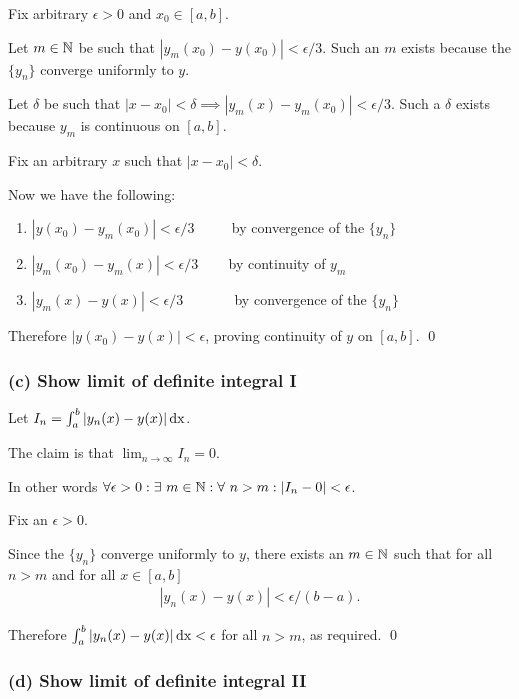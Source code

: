 \documentclass[12pt]{article}
\begin{document}

Fix arbitrary $\epsilon > 0$ and $x_0 \in [a,b]$.

Let $m \in \mathbb{N}$ be such that $|y_m(x_0) - y(x_0)| < \epsilon/3$. Such an $m$
exists because the $\{y_n\}$ converge uniformly to $y$.

Let $\delta$ be such that
$|x - x_0| < \delta \implies |y_m(x) - y_m(x_0)| < \epsilon/3$. Such a
$\delta$ exists because $y_m$ is continuous on $[a,b]$.

Fix an arbitrary $x$ such that $|x - x_0| < \delta$.

Now we have the following:
\begin{enumerate}
\item $|y(x_0) - y_m(x_0)| < \epsilon/3$ ~~~~ by convergence of the $\{y_n\}$
\item $|y_m(x_0) - y_m(x)| < \epsilon/3$ ~~~ by continuity of $y_m$
\item $|y_m(x) - y(x)| < \epsilon/3$    ~~~~~~ by convergence of the $\{y_n\}$
\end{enumerate}
Therefore $|y(x_0) - y(x)| < \epsilon$, proving continuity of $y$ on $[a,b]$. \qed


\subsubsection*{(c) Show limit of definite integral I}

Let $I_n = \int_a^b |y_n(x) - y(x)| \operatorname{\text{dx}}$.

The claim is that $\lim_{n \to \infty} I_n = 0$.

In other words
$\forall \epsilon > 0: \exists~ m \in \mathbb{N}: \forall~ n > m: |I_n - 0| <
\epsilon$.

Fix an $\epsilon > 0$.

Since the $\{y_n\}$ converge uniformly to $y$, there exists an $m \in \mathbb{N}$
such that for all $n > m$ and for all $x \in [a,b]$
\begin{align*}
  |y_n(x) - y(x)| < \epsilon/(b-a).
\end{align*}

Therefore $\int_a^b |y_n(x) - y(x)| \operatorname{\text{dx}} < \epsilon$ for all $n > m$, as required. \qed

\subsubsection*{(d) Show limit of definite integral II}
\end{document}
